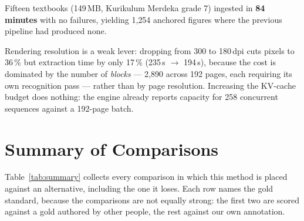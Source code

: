 \documentclass[journal]{IEEEtran}
\begin{document}
Fifteen textbooks (149\,MB, Kurikulum Merdeka grade 7) ingested in
\textbf{84 minutes} with no failures, yielding 1{,}254 anchored figures where the
previous pipeline had produced none.

Rendering resolution is a weak lever: dropping from 300 to 180\,dpi cuts pixels to
36\,\% but extraction time by only 17\,\% (235\,s $\to$ 194\,s), because the cost
is dominated by the number of \emph{blocks} --- 2{,}890 across 192 pages, each
requiring its own recognition pass --- rather than by page resolution. Increasing
the KV-cache budget does nothing: the engine already reports capacity for 258
concurrent sequences against a 192-page batch.

\section{Summary of Comparisons}
\label{sec:summary}

Table~\ref{tab:summary} collects every comparison in which this method is placed
against an alternative, including the one it loses. Each row names the gold
standard, because the comparisons are not equally strong: the first two are scored
against a gold authored by other people, the rest against our own annotation.
\end{document}
